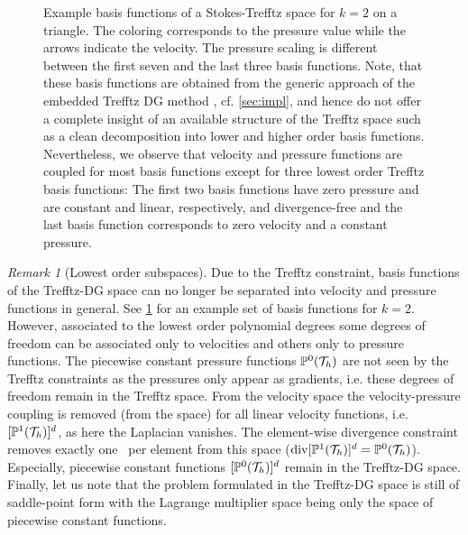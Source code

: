 \documentclass[sn-mathphys,Numbered]{sn-jnl}%
\theoremstyle{remark}%
\newtheorem{remark}{Remark}%
\theoremstyle{definition}%
\begin{document}
\begin{figure}
    \caption{Example basis functions of a Stokes-Trefftz space for $k=2$ on a triangle. The coloring corresponds to the pressure value while the arrows indicate the velocity. The pressure scaling is different between the first seven and the last three basis functions. Note, that these basis functions are obtained from the generic approach of the embedded Trefftz DG method \cite{2201.07041}, cf. \cref{sec:impl}, and hence do not offer a complete insight of an available structure of the Trefftz space such as a clean decomposition into lower and higher order basis functions. Nevertheless, we observe that velocity and pressure functions are coupled for most basis functions except for three lowest order Trefftz basis functions: The first two basis functions have zero pressure and are constant and linear, respectively, and divergence-free and the last basis function corresponds to zero velocity and a constant pressure.}
    \label{fig:trefftzbasis}
\end{figure}

\begin{remark}[Lowest order subspaces]\label{rem:loworder}
  Due to the Trefftz constraint, basis functions of the Trefftz-DG space can no
  longer be separated into velocity and pressure functions in general. See \cref{fig:trefftzbasis} for an example set of basis functions for $k=2$. However,
  associated to the lowest order polynomial degrees some degrees of freedom can
  be associated only to velocities and others only to pressure functions. The
  piecewise constant pressure functions $\mathbb{P}^0({\mathcal{T}_h})$ are not seen by the Trefftz
  constraints as the pressures only appear as gradients, i.e. these degrees of
  freedom remain in the Trefftz space. From the velocity space the
  velocity-pressure coupling is removed (from the space) for all linear velocity
  functions, i.e. $[\mathbb{P}^1({\mathcal{T}_h})]^d$, as here the Laplacian vanishes. The
  element-wise divergence constraint removes exactly one \dof ~per element from
  this space ($\operatorname{\mathrm{div}} [\mathbb{P}^1({\mathcal{T}_h})]^d = \mathbb{P}^0({\mathcal{T}_h})$). Especially, piecewise
  constant functions $[\mathbb{P}^0({\mathcal{T}_h})]^d$ remain in the Trefftz-DG space.
  Finally, let us note that the problem formulated in the Trefftz-DG space is
  still of saddle-point form with the Lagrange multiplier space being only the space of 
  piecewise constant functions. 
\end{remark}
\end{document}
